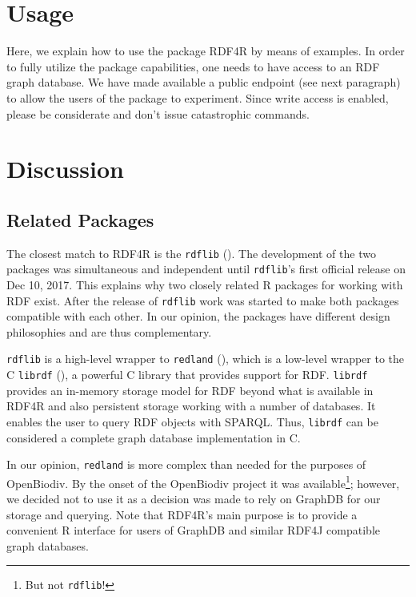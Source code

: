 \section{Usage}

Here, we explain how to use the package RDF4R by means of examples. In order to fully utilize the package capabilities, one needs to have access to an RDF graph database. We have made available a public endpoint (see next paragraph) to allow the users of the package to experiment. Since write access is enabled, please be considerate and don't issue catastrophic commands.

\section{Discussion}

\subsection{Related Packages}

The closest match to RDF4R is the {\tt rdflib} (\cite{boettiger_rdflib:_2018}). The development of the two packages was simultaneous and independent until {\tt rdflib}'s first official release on Dec 10, 2017. This explains why two closely related R packages for working with RDF exist. After the release of {\tt rdflib} work was started  to make both packages compatible with each other. In our opinion, the packages have different design philosophies and are thus complementary.

{\tt rdflib} is a high-level wrapper to {\tt redland} (\cite{jones_redland:_2016}), which is a low-level wrapper to the C {\tt librdf} (\cite{beckett_redland_2014}), a powerful C library that provides support for RDF. {\tt librdf} provides an in-memory storage model for RDF beyond what is available in RDF4R and also persistent storage working with a number of databases. It enables the user to query RDF objects with SPARQL. Thus, {\tt librdf} can be considered a complete graph database implementation in C.

In our opinion, {\tt redland} is more complex than needed for the purposes of OpenBiodiv. By the onset of the OpenBiodiv project it was available\footnote{But not {\tt rdflib}!}; however, we decided not to use it as a decision was made to rely on GraphDB for our storage and querying. Note that RDF4R's main purpose is to provide a convenient R interface for users of GraphDB and similar RDF4J compatible graph databases.


